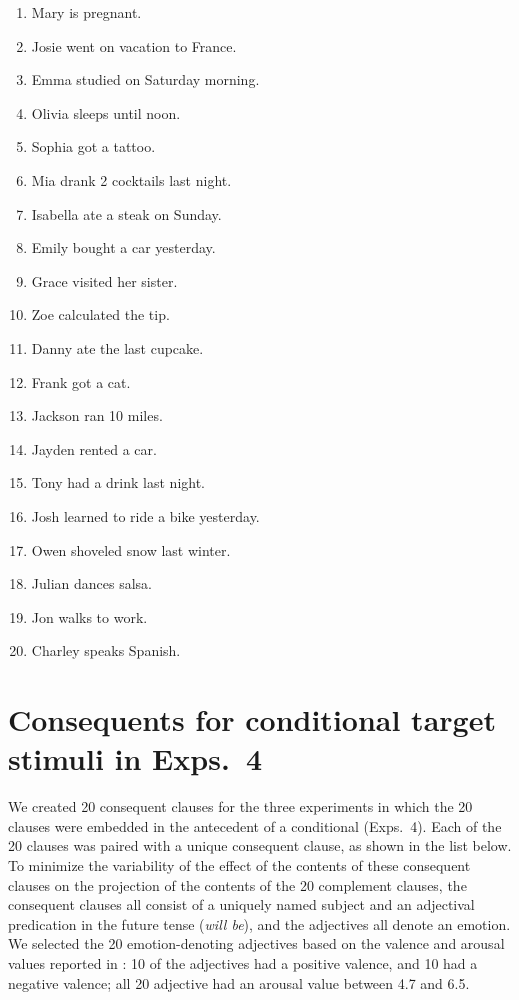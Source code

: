 \documentclass[a4paper,12pt,twoside]{article}
\begin{document}
    \begin{enumerate}%
        \item Mary is pregnant.
        \item Josie went on vacation to France.
        \item Emma studied on Saturday morning.
        \item Olivia sleeps until noon.
        \item Sophia got a tattoo.
        \item Mia drank 2 cocktails last night.
        \item Isabella ate a steak on Sunday.
        \item  Emily bought a car yesterday.
        \item  Grace visited her sister.
        \item Zoe calculated the tip.

        
        \item  Danny ate the last cupcake.
        \item  Frank got a cat.
        \item  Jackson ran 10 miles.
        \item  Jayden rented a car.
        \item  Tony had a drink last night.
        \item  Josh learned to ride a bike yesterday.
        \item  Owen shoveled snow last winter.
        \item  Julian dances salsa.
        \item  Jon walks to work.
        \item  Charley speaks Spanish.
            
    \end{enumerate}

\section{Consequents for conditional target stimuli in Exps.~4} \label{app:b-consequents}
    We created 20 consequent clauses for the three experiments in which the 20 clauses were embedded in the antecedent of a conditional (Exps.~4). Each of the 20 clauses was paired with a unique consequent clause, as shown in the list below. To minimize the variability of the effect of the contents of these consequent clauses on the projection of the contents of the 20 complement clauses, the consequent clauses all consist of a uniquely named subject and an adjectival predication in the future tense ({\em will be}), and the adjectives all denote an emotion. We selected the 20 emotion-denoting adjectives based on the valence and arousal values reported in \citealt{warriner-etal2013}: 10 of the adjectives had a positive valence, and 10 had a negative valence; all 20 adjective had an arousal value between 4.7 and 6.5. 
    
\end{document}
